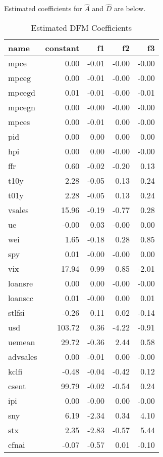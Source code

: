 \documentclass[11pt, letterpaper]{article}\usepackage[]{graphicx}\usepackage[]{color}
\begin{document}
Estimated coefficients for $\widehat{A}$ and $\widehat{D}$ are below.
\begin{table}[H]
\centering
\begingroup\footnotesize
\begin{tabular}{lrrrr}
  \hline
name & constant & f1 & f2 & f3 \\ 
  \hline
mpce & 0.00 & -0.01 & -0.00 & -0.00 \\ 
  mpceg & 0.00 & -0.01 & -0.00 & -0.00 \\ 
  mpcegd & 0.01 & -0.01 & -0.00 & -0.01 \\ 
  mpcegn & 0.00 & -0.00 & -0.00 & -0.00 \\ 
  mpces & 0.00 & -0.01 & 0.00 & -0.00 \\ 
  pid & 0.00 & 0.00 & 0.00 & 0.00 \\ 
  hpi & 0.00 & 0.00 & -0.00 & -0.00 \\ 
  ffr & 0.60 & -0.02 & -0.20 & 0.13 \\ 
  t10y & 2.28 & -0.05 & 0.13 & 0.24 \\ 
  t01y & 2.28 & -0.05 & 0.13 & 0.24 \\ 
  vsales & 15.96 & -0.19 & -0.77 & 0.28 \\ 
  ue & -0.00 & 0.03 & -0.00 & 0.00 \\ 
  wei & 1.65 & -0.18 & 0.28 & 0.85 \\ 
  spy & 0.01 & -0.00 & -0.00 & 0.00 \\ 
  vix & 17.94 & 0.99 & 0.85 & -2.01 \\ 
  loansre & 0.00 & 0.00 & -0.00 & -0.00 \\ 
  loanscc & 0.01 & -0.00 & 0.00 & 0.01 \\ 
  stlfsi & -0.26 & 0.11 & 0.02 & -0.14 \\ 
  usd & 103.72 & 0.36 & -4.22 & -0.91 \\ 
  uemean & 29.72 & -0.36 & 2.44 & 0.58 \\ 
  advsales & 0.00 & -0.01 & 0.00 & -0.00 \\ 
  kclfi & -0.48 & -0.04 & -0.42 & 0.12 \\ 
  csent & 99.79 & -0.02 & -0.54 & 0.24 \\ 
  ipi & 0.00 & -0.00 & 0.00 & -0.00 \\ 
  sny & 6.19 & -2.34 & 0.34 & 4.10 \\ 
  stx & 2.35 & -2.83 & -0.57 & 5.44 \\ 
  cfnai & -0.07 & -0.57 & 0.01 & -0.10 \\ 
   \hline
\end{tabular}
\endgroup
\caption{Estimated DFM Coefficients} 
\end{table}
\end{document}
